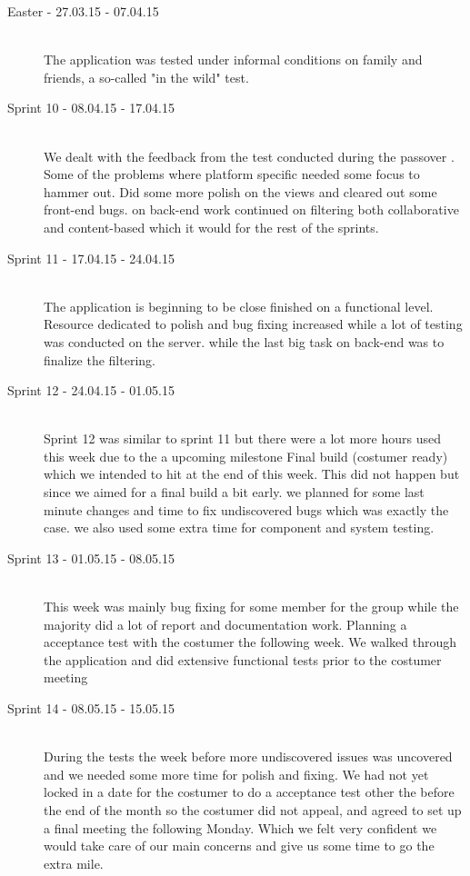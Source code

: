 \begin{description}
	\item[Easter - 27.03.15 - 07.04.15] \hfill \\ 
	The application was tested under informal conditions on family and friends, a so-called "in the wild" test.
	
	\item[Sprint 10 - 08.04.15 - 17.04.15] \hfill \\ 
	We dealt with the feedback from the test conducted during the passover . Some of the problems where platform specific needed some focus to hammer out. Did some more polish on the  views and cleared out some front-end bugs. on back-end work continued on filtering both collaborative and content-based which it would for the rest of the sprints. 

	\item[Sprint 11 - 17.04.15 - 24.04.15] \hfill \\ 
	The application is beginning to be close finished on a functional level. Resource dedicated to polish and bug fixing increased while a lot of testing was conducted on the server. while the last big task on back-end was to finalize the filtering.

	\item[Sprint 12 - 24.04.15 - 01.05.15] \hfill \\ 
	Sprint 12 was similar to sprint 11 but there were a lot more hours used this week due to the a upcoming milestone Final build (costumer ready) which we intended to hit at the end of this week. This did not happen but since we aimed for a final build a bit early. we planned for some last minute changes and time to fix undiscovered bugs which was exactly the case. we also used some extra time for component and system testing.
	
	\item[Sprint 13 - 01.05.15 - 08.05.15] \hfill \\ 
	This week was mainly bug fixing for some member for the group while the majority did a lot of report and documentation work. Planning a acceptance test with the costumer the following week. We walked through the application and did extensive functional tests prior to the costumer meeting 

	\item[Sprint 14 - 08.05.15 - 15.05.15] \hfill \\ 
	During the tests the week before more undiscovered issues was uncovered and we needed some more time for polish and fixing. We had not yet locked in a date for the costumer to do a acceptance test other the before the end of the month so the costumer did not appeal, and agreed to set up a final meeting the following Monday. Which we felt very confident we would take care of our main concerns and give us some time to go the extra mile.
	

\end{description}
